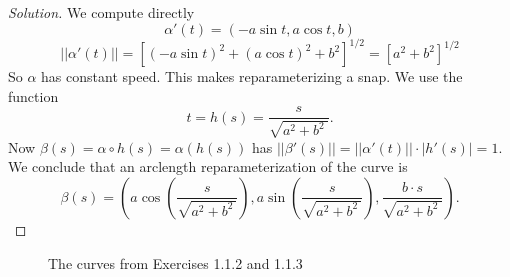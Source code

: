 \documentclass[Shifrin_Solutions_Spring_2018]{subfiles}
\begin{document}
\begin{proof}[Solution] We compute directly
\[
\alpha'(t) = ( - a \sin t, a \cos t , b)
\]
\[
||\alpha'(t)|| = [ (-a\sin t)^2 + (a \cos t)^2 + b^2]^{1/2} = [a^2+b^2]^{1/2}
\]
So $\alpha$ has constant speed. This makes reparameterizing a snap. We use the
function
\[
t = h(s) = \dfrac{s}{\sqrt{a^2 + b^2 \ }}.
\]
Now $\beta(s) = \alpha \circ h(s) = \alpha(h(s))$ has $||\beta'(s)|| =
||\alpha'(t)||\cdot |h'(s)| = 1$.
We conclude that an arclength reparameterization of the curve is
\[
\beta(s) = \left( a \cos \left(\dfrac{s}{\sqrt{a^2 + b^2 \ }}\right) , a
\sin\left( \dfrac{s}{\sqrt{a^2 + b^2 \ }}\right) , \dfrac{b \cdot s}{\sqrt{a^2
+ b^2 \ }} \right).
\]
\end{proof}

\begin{figure}[h]
\centering
{}
  \caption{The curves from Exercises 1.1.2 and 1.1.3}
\end{figure}


\clearpage

\end{document}
